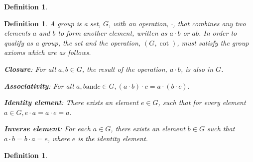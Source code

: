 \documentclass{article}
\newtheorem{ring}{Definition}
\newtheorem{group}{Definition}
\newtheorem{field}{Definition}
\begin{document}
\begin{ring}

\end{ring}

\begin{group}
A group is a set, $G$, with an operation, $\cdot$, that combines
any two elements $a$ and $b$ to form another element, written as
$a \cdot b$ or $ab$. In order to qualify as a group, the set
and the operation, $(G, \cot)$, must satisfy the \textit{group axioms}
which are as follows.

\textbf{Closure}: For all $a, b \in G$, the result of the operation,
$a \cdot b$, is also in $G$.

\textbf{Associativity}: For all $a, b \text{and} c \in G, (a \cdot b)
\cdot c = a \cdot (b \cdot c)$.

\textbf{Identity element}: There exists an element $e \in G$, such that
for every element $a \in G, e \cdot a = a \cdot e = a$.

\textbf{Inverse element}: For each $a \in G$, there exists an element
$b \in G$ such that $a \cdot b = b \cdot a = e$, where $e$ is the
identity element.

\end{group}

\begin{field}

\end{field}
\end{document}
